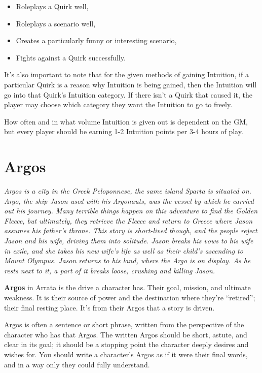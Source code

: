 \documentclass[../main.tex]{subfiles}
\begin{document}
    \begin{itemize}
        \item Roleplays a Quirk well,
        \item Roleplays a scenario well,
        \item Creates a particularly funny or interesting scenario,
        \item Fights against a Quirk successfully.
    \end{itemize}

        It's also important to note that for the given methods of gaining Intuition, if a particular Quirk is a reason why Intuition is being gained, then the Intuition will go into that Quirk's Intuition category. If there isn't a Quirk that caused it, the player may choose which category they want the Intuition to go to freely.

        How often and in what volume Intuition is given out is dependent on the GM, but every player should be earning 1-2 Intuition points per 3-4 hours of play.

    \section{Argos}

        \begin{mdframed}[style=Arrata]
            {\em
                Argos is a city in the Greek Peloponnese, the same island Sparta is situated on. Argo, the ship Jason used with his Argonauts, was the vessel by which he carried out his journey. Many terrible things happen on this adventure to find the Golden Fleece, but ultimately, they retrieve the Fleece and return to Greece where Jason assumes his father's throne. This story is short-lived though, and the people reject Jason and his wife, driving them into solitude. Jason breaks his vows to his wife in exile, and she takes his new wife's life as well as their child's ascending to Mount Olympus. Jason returns to his land, where the Argo is on display. As he rests next to it, a part of it breaks loose, crushing and killing Jason.
            }
        \end{mdframed}
        
        \textbf{Argos} in Arrata is the drive a character has. Their goal, mission, and ultimate weakness. It is their source of power and the destination where they're ``retired''; their final resting place. It's from their Argos that a story is driven.

        Argos is often a sentence or short phrase, written from the perspective of the character who has that Argos. The written Argos should be short, astute, and clear in its goal; it should be a stopping point the character deeply desires and wishes for. You should write a character's Argos as if it were their final words, and in a way only they could fully understand.
\end{document}
